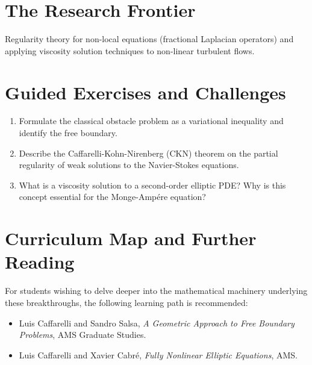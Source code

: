 \section{The Research Frontier}
Regularity theory for non-local equations (fractional Laplacian operators) and applying viscosity solution techniques to non-linear turbulent flows.

\section{Guided Exercises and Challenges}
\begin{enumerate}[label=\textbf{\arabic*.}]
  \item Formulate the classical obstacle problem as a variational inequality and identify the free boundary.
  \item Describe the Caffarelli-Kohn-Nirenberg (CKN) theorem on the partial regularity of weak solutions to the Navier-Stokes equations.
  \item What is a viscosity solution to a second-order elliptic PDE? Why is this concept essential for the Monge-Amp\'ere equation?
\end{enumerate}

\section{Curriculum Map and Further Reading}
For students wishing to delve deeper into the mathematical machinery underlying these breakthroughs, the following learning path is recommended:
\begin{itemize}
  \item Luis Caffarelli and Sandro Salsa, \emph{A Geometric Approach to Free Boundary Problems}, AMS Graduate Studies.
  \item Luis Caffarelli and Xavier Cabr\'e, \emph{Fully Nonlinear Elliptic Equations}, AMS.
\end{itemize}

